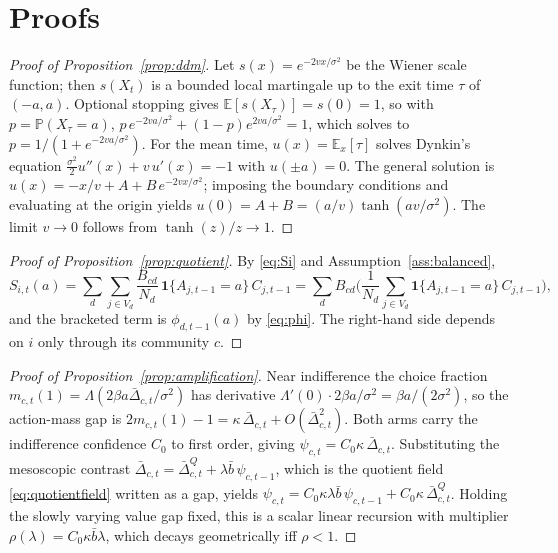 \documentclass[11pt]{article}
\newcommand{\E}{\mathbb{E}}
\newcommand{\Prob}{\mathbb{P}}
\newcommand{\1}{\mathbf{1}}
\begin{document}
\appendix

\section{Proofs}
\label{app:proofs}

\begin{proof}[Proof of Proposition~\ref{prop:ddm}]
Let $s(x)=e^{-2vx/\sigma^2}$ be the Wiener scale function; then $s(X_t)$ is a
bounded local martingale up to the exit time $\tau$ of $(-a,a)$. Optional
stopping gives $\E[s(X_\tau)]=s(0)=1$, so with $p=\Prob(X_\tau=a)$,
$p\,e^{-2va/\sigma^2}+(1-p)e^{2va/\sigma^2}=1$, which solves to
$p=1/(1+e^{-2va/\sigma^2})$. For the mean time, $u(x)=\E_x[\tau]$ solves Dynkin's
equation $\tfrac{\sigma^2}{2}u''(x)+v\,u'(x)=-1$ with $u(\pm a)=0$. The general
solution is $u(x)=-x/v+A+B\,e^{-2vx/\sigma^2}$; imposing the boundary conditions
and evaluating at the origin yields $u(0)=A+B=(a/v)\tanh(av/\sigma^2)$. The limit
$v\to0$ follows from $\tanh(z)/z\to1$.
\end{proof}

\begin{proof}[Proof of Proposition~\ref{prop:quotient}]
By \eqref{eq:Si} and Assumption~\ref{ass:balanced},
\[
S_{i,t}(a)=\sum_{d}\sum_{j\in V_d}\frac{B_{cd}}{N_d}\,\1\{A_{j,t-1}=a\}\,C_{j,t-1}
=\sum_{d} B_{cd}\Big(\frac1{N_d}\sum_{j\in V_d}\1\{A_{j,t-1}=a\}\,C_{j,t-1}\Big),
\]
and the bracketed term is $\phi_{d,t-1}(a)$ by \eqref{eq:phi}. The right-hand
side depends on $i$ only through its community $c$.
\end{proof}

\begin{proof}[Proof of Proposition~\ref{prop:amplification}]
Near indifference the choice fraction $m_{c,t}(1)=\Lambda(2\beta a\bar\Delta_{c,t}/\sigma^2)$
has derivative $\Lambda'(0)\cdot 2\beta a/\sigma^2=\beta a/(2\sigma^2)$, so the
action-mass gap is $2m_{c,t}(1)-1=\kappa\,\bar\Delta_{c,t}+O(\bar\Delta_{c,t}^2)$.
Both arms carry the indifference confidence $C_0$ to first order, giving
$\psi_{c,t}=C_0\kappa\,\bar\Delta_{c,t}$. Substituting the mesoscopic contrast
$\bar\Delta_{c,t}=\bar\Delta^Q_{c,t}+\lambda\bar b\,\psi_{c,t-1}$, which is the
quotient field \eqref{eq:quotientfield} written as a gap, yields
$\psi_{c,t}=C_0\kappa\lambda\bar b\,\psi_{c,t-1}+C_0\kappa\,\bar\Delta^Q_{c,t}$.
Holding the slowly varying value gap fixed, this is a scalar linear recursion
with multiplier $\rho(\lambda)=C_0\kappa\bar b\lambda$, which decays geometrically
iff $\rho<1$.
\end{proof}
\end{document}
